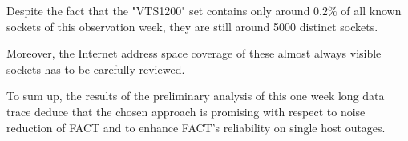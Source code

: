 \documentclass{sigcomm-alternate}
\begin{document}
Despite the fact that the "VTS1200" set contains only around $0.2\%$ of all known sockets of this observation week, they are still around 5000 distinct sockets.

Moreover, the Internet address space coverage of these almost always visible sockets has to be carefully reviewed.

To sum up, the results of the preliminary analysis of this one week long data trace deduce that the chosen approach is promising with respect to noise reduction of FACT and to enhance FACT's reliability on single host outages.


 
% 

\end{document}
